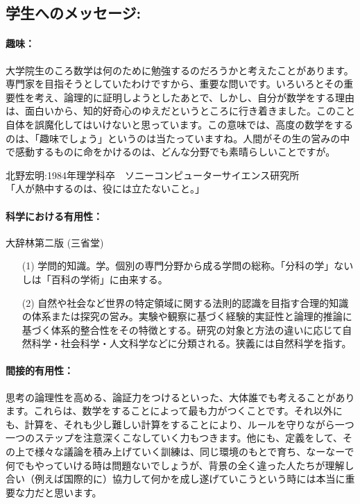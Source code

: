 \documentclass[12pt]{jarticle}
\begin{document}
\subsection{学生へのメッセージ:}

\paragraph{趣味：}

大学院生のころ数学は何のために勉強するのだろうかと考えたことがあります。専門家を目指そうとしていたわけですから、重要な問いです。いろいろとその重要性を考え、論理的に証明しようとしたあとで、しかし、自分が数学をする理由は、面白いから、知的好奇心のゆえだというところに行き着きました。このこと自体を誤魔化してはいけないと思っています。この意味では、高度の数学をするのは、「趣味でしょう」というのは当たっていますね。人間がその生の営みの中で感動するものに命をかけるのは、どんな分野でも素晴らしいことですが。

北野宏明:1984年理学科卒　ソニーコンピューターサイエンス研究所\\
「人が熱中するのは、役には立たないこと。」

\paragraph{科学における有用性：}

大辞林第二版 (三省堂)
\begin{itemize}
\item[(1)] 学問的知識。学。個別の専門分野から成る学問の総称。「分科の学」ないしは「百科の学術」に由来する。
\item[(2)] 自然や社会など世界の特定領域に関する法則的認識を目指す合理的知識の体系または探究の営み。実験や観察に基づく経験的実証性と論理的推論に基づく体系的整合性をその特徴とする。研究の対象と方法の違いに応じて自然科学・社会科学・人文科学などに分類される。狭義には自然科学を指す。
\end{itemize}

\paragraph{間接的有用性：}

思考の論理性を高める、論証力をつけるといった、大体誰でも考えることがあります。これらは、数学をすることによって最も力がつくことです。それ以外にも、計算を、それも少し難しい計算をすることにより、ルールを守りながら一つ一つのステップを注意深くこなしていく力もつきます。他にも、定義をして、その上で様々な議論を積み上げていく訓練は、同じ環境のもとで育ち、なーなーで何でもやっていける時は問題ないでしょうが、背景の全く違った人たちが理解し合い（例えば国際的に）協力して何かを成し遂げていこうという時には本当に重要な力だと思います。
\end{document}
